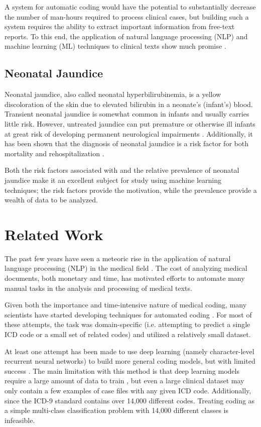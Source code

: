 \documentclass[conference]{IEEEtran}
\begin{document}
A system for automatic coding would have the potential to substantially decrease the number of man-hours required to process clinical cases, but building such a system requires the ability to extract important information from free-text reports. To this end, the application of natural language processing (NLP) and machine learning (ML) techniques to clinical texts show much promise \cite{Meystre}.

\subsection{Neonatal Jaundice}\label{AA}
Neonatal jaundice, also called neonatal hyperbilirubinemia, is a yellow discoloration of the skin due to elevated bilirubin in a neonate's (infant's) blood. Transient neonatal jaundice is somewhat common in infants and usually carries little risk. However, untreated jaundice can put premature or otherwise ill infants at great risk of developing permanent neurological impairments \cite{Lantzy}. Additionally, it has been shown that the diagnosis of neonatal jaundice is a risk factor for both mortality and rehospitalization \cite{Escobar}. 

Both the risk factors associated with and the relative prevalence of neonatal jaundice make it an excellent subject for study using machine learning techniques; the risk factors provide the motivation, while the prevalence provide a wealth of data to be analyzed.

\section{Related Work}
The past few years have seen a meteoric rise in the application of natural language processing (NLP) in the medical field \cite{Wolniewicz}. The cost of analyzing medical documents, both monetary and time, has motivated efforts to automate many manual tasks in the analysis and processing of medical texts.

Given both the importance and time-intensive nature of medical coding, many scientists have started developing techniques for automated coding \cite{Meystre}. For most of these attempts, the task was domain-specific (i.e. attempting to predict a single ICD code or a small set of related codes) and utilized a relatively small dataset. 

At least one attempt has been made to use deep learning (namely character-level recurrent neural networks) to build more general coding models, but with limited success \cite{Shi}. The main limitation with this method is that deep learning models require a large amount of data to train \cite{Chen}, but even a large clinical dataset may only contain a few examples of case files with any given ICD code. Additionally, since the ICD-9 standard contains over 14,000 different codes. Treating coding as a simple multi-class classification problem with 14,000 different classes is infeasible.
\end{document}
